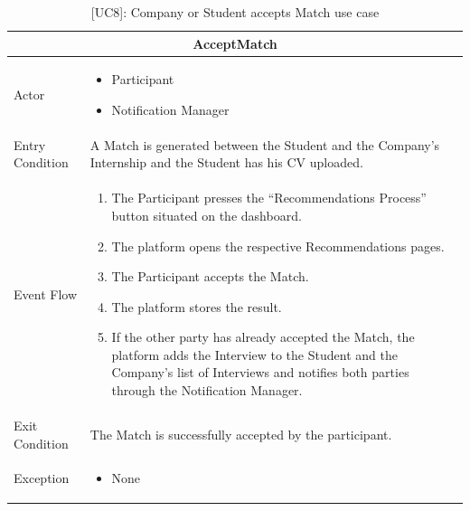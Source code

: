 \begin{table}[H]
    \centering
    \begin{tabular}{|p{3cm}|p{12cm}|}
    \hline
    \multicolumn{2}{|c|}{\textbf{AcceptMatch}} \\ \hline
    Actor & 
    \begin{itemize}
        \item Participant
        \item Notification Manager
    \end{itemize}\\ \hline
    Entry Condition & A Match is generated between the Student and the Company's Internship and the Student has his CV uploaded. \\ \hline
    Event Flow &  
    \begin{enumerate}
        \item The Participant presses the “Recommendations Process” button situated on the dashboard.
        \item The platform opens the respective Recommendations pages.
        \item The Participant accepts the Match.
        \item The platform stores the result.
        \item If the other party has already accepted the Match, the platform adds the Interview to the Student and the Company's list of Interviews and notifies both parties through the Notification Manager.
    \end{enumerate} \\ \hline
    Exit Condition & The Match is successfully accepted by the participant.\\ \hline
    Exception & 
    \begin{itemize}
        \item None
    \end{itemize} \\ \hline
    \end{tabular}
    \caption{[UC8]: Company or Student accepts Match use case}
    \label{tab:UC8}
\end{table}

